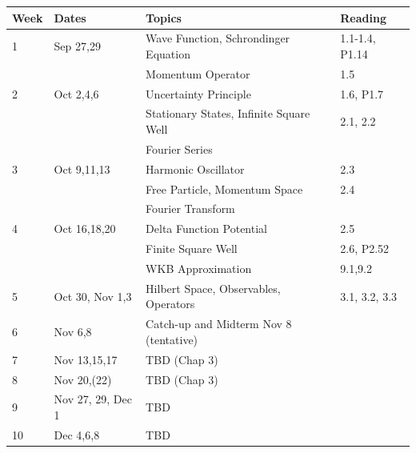 \documentclass[12pt]{article}
\begin{document}
\noindent
\begin{tabular}{llll}
\textbf{Week} & \textbf{Dates} & \textbf{Topics} & \textbf{Reading} \\
\hline
1  & Sep 27,29         & Wave Function, Schrondinger Equation & 1.1-1.4, P1.14 \\
   &                   & Momentum Operator  & 1.5 \\
\hline
2  & Oct 2,4,6         & Uncertainty Principle & 1.6, P1.7 \\
   &                   & Stationary States, Infinite Square Well & 2.1, 2.2 \\
   &                   & Fourier Series   & \\
\hline
3  & Oct 9,11,13       & Harmonic Oscillator & 2.3 \\
   &                   & Free Particle, Momentum Space & 2.4 \\
   &                   & Fourier Transform  &  \\
\hline
4  & Oct 16,18,20      & Delta Function Potential & 2.5 \\
   &                   & Finite Square Well & 2.6, P2.52\\
   &                   & WKB Approximation & 9.1,9.2 \\
\hline
5  & Oct 30, Nov 1,3   & Hilbert Space, Observables, Operators & 3.1, 3.2, 3.3\\
\hline
6  & Nov 6,8           & Catch-up and Midterm Nov 8 (tentative) \\
\hline
7  & Nov 13,15,17      & TBD (Chap 3) \\
8  & Nov 20,(22)       & TBD (Chap 3) \\
9  & Nov 27, 29, Dec 1 & TBD \\
10 & Dec 4,6,8         & TBD \\
\hline
\end{tabular}\\ \vskip 1cm
\end{document}
